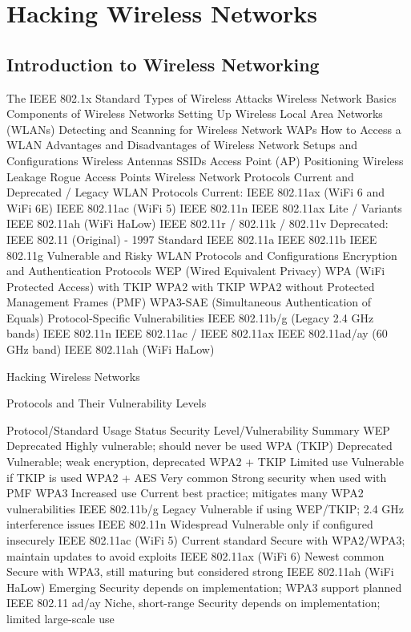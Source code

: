 \chapter{Hacking Wireless Networks}
\section{Introduction to Wireless Networking}
	The IEEE 802.1x Standard
	Types of Wireless Attacks
	Wireless Network Basics
	Components of Wireless Networks
	Setting Up Wireless Local Area Networks (WLANs)
	Detecting and Scanning for Wireless Network WAPs
	How to Access a WLAN
	Advantages and Disadvantages of Wireless Network Setups and Configurations
	Wireless Antennas
	SSIDs
	Access Point (AP) Positioning
	Wireless Leakage
	Rogue Access Points
	Wireless Network Protocols
		Current and Deprecated / Legacy WLAN Protocols
		Current:
			IEEE 802.11ax (WiFi 6 and WiFi 6E)
			IEEE 802.11ac (WiFi 5)
			IEEE 802.11n
			IEEE 802.11ax Lite / Variants
			IEEE 802.11ah (WiFi HaLow)
			IEEE 802.11r / 802.11k / 802.11v		
Deprecated:
			IEEE 802.11 (Original) - 1997 Standard
			IEEE 802.11a
			IEEE 802.11b
			IEEE 802.11g
		Vulnerable and Risky WLAN Protocols and Configurations
			Encryption and Authentication Protocols
				WEP (Wired Equivalent Privacy)
				WPA (WiFi Protected Access) with TKIP
				WPA2 with TKIP
				WPA2 without Protected Management Frames (PMF)
				WPA3-SAE (Simultaneous Authentication of Equals)
		Protocol-Specific Vulnerabilities
			IEEE 802.11b/g (Legacy 2.4 GHz bands)
			IEEE 802.11n
			IEEE 802.11ac / IEEE 802.11ax
			IEEE 802.11ad/ay (60 GHz band)
			IEEE 802.11ah (WiFi HaLow)

Hacking Wireless Networks

Protocols and Their Vulnerability Levels

Protocol/Standard	Usage Status	Security Level/Vulnerability Summary
WEP			Deprecated	Highly vulnerable; should never be used
WPA (TKIP)		Deprecated	Vulnerable; weak encryption, deprecated
WPA2 + TKIP		Limited use	Vulnerable if TKIP is used
WPA2 + AES		Very common	Strong security when used with PMF
WPA3			Increased use	Current best practice; mitigates many WPA2 vulnerabilities
IEEE 802.11b/g		Legacy		Vulnerable if using WEP/TKIP; 2.4 GHz interference issues
IEEE 802.11n		Widespread	Vulnerable only if configured insecurely
IEEE 802.11ac (WiFi 5)	Current standard	Secure with WPA2/WPA3; maintain updates to avoid exploits
IEEE 802.11ax (WiFi 6)	Newest common		Secure with WPA3, still maturing but considered strong
IEEE 802.11ah (WiFi HaLow)	Emerging	Security depends on implementation; WPA3 support planned
IEEE 802.11 ad/ay	Niche, short-range	Security depends on implementation; limited large-scale use

